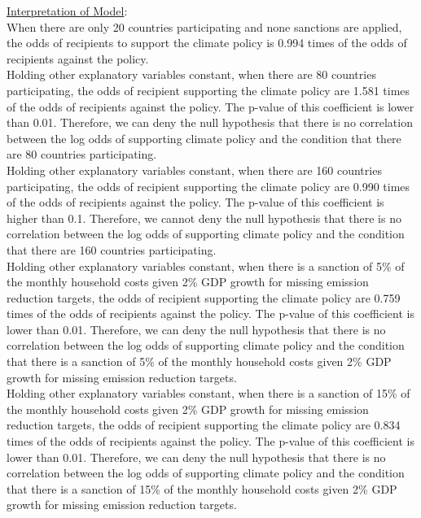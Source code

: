 \documentclass[12pt,letterpaper]{article}
\begin{document}
\begin{enumerate}
\underline{Interpretation of Model}: \\


When there are only 20 countries participating and none sanctions are applied, the odds of recipients to support the climate policy is 0.994 times of the odds of recipients against the policy.\\

Holding other explanatory variables constant, when there are 80 countries participating, the odds of recipient supporting the climate policy are 1.581 times of the odds of recipients against the policy. The p-value of this coefficient is lower than 0.01. Therefore, we can deny the null hypothesis that there is no correlation between the log odds of supporting climate policy and the condition that there are 80 countries participating. \\ 

Holding other explanatory variables constant, when there are 160 countries participating, the odds of recipient supporting the climate policy are 0.990 times of the odds of recipients against the policy. The p-value of this coefficient is higher than 0.1. Therefore, we cannot deny the null hypothesis that there is no correlation between the log odds of supporting climate policy and the condition that there are 160 countries participating.\\

Holding other explanatory variables constant, when there is a sanction of 5\% of the monthly household costs given 2\% GDP growth for missing emission reduction targets, the odds of recipient supporting the climate policy are 0.759 times of the odds of recipients against the policy. The p-value of this coefficient is lower than 0.01. Therefore, we can deny the null hypothesis that there is no correlation between the log odds of supporting climate policy and the condition that there is a sanction of 5\% of the monthly household costs given 2\% GDP growth for missing emission reduction targets.\\

Holding other explanatory variables constant, when there is a sanction of 15\% of the monthly household costs given 2\% GDP growth for  missing emission reduction targets, the odds of recipient supporting the climate policy are 0.834 times of the odds of recipients against the policy. The p-value of this coefficient is lower than 0.01. Therefore, we can deny the null hypothesis that there is no correlation between the log odds of supporting climate policy and the condition that there is a sanction of 15\% of the monthly household costs given 2\% GDP growth for missing emission reduction targets.\\


\end{enumerate}
\end{document}

